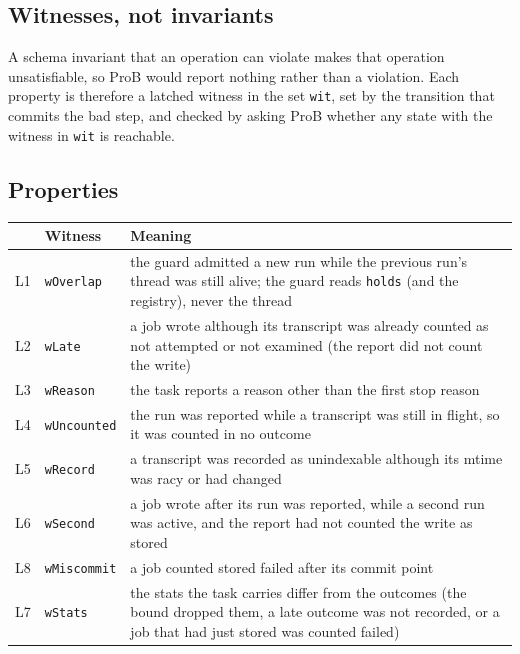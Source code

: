 \documentclass[a4paper,10pt,fleqn]{article}
\newcommand{\field}[1]{\texttt{#1}}
\begin{document}
\subsection{Witnesses, not invariants}

A schema invariant that an operation can violate makes that operation
unsatisfiable, so ProB would report nothing rather than a violation. Each
property is therefore a latched witness in the set \field{wit}, set by the
transition that commits the bad step, and checked by asking ProB whether any
state with the witness in \field{wit} is reachable.

\subsection{Properties}

\begin{center}
\begin{tabular}{@{}cll@{}}
\toprule
 & Witness & Meaning \\
\midrule
L1 & \field{wOverlap} & the guard admitted a new run while the previous run's
  thread was still alive; the guard reads \field{holds} (and the registry),
  never the thread \\
L2 & \field{wLate} & a job wrote although its transcript was already counted
  as not attempted or not examined (the report did not count the write) \\
L3 & \field{wReason} & the task reports a reason other than the first stop
  reason \\
L4 & \field{wUncounted} & the run was reported while a transcript was still
  in flight, so it was counted in no outcome \\
L5 & \field{wRecord} & a transcript was recorded as unindexable although its
  mtime was racy or had changed \\
L6 & \field{wSecond} & a job wrote after its run was reported, while a second run
  was active, and the report had not counted the write as stored \\
L8 & \field{wMiscommit} & a job counted stored failed after its commit point \\
L7 & \field{wStats} & the stats the task carries differ from the outcomes (the
  bound dropped them, a late outcome was not recorded, or a job that had just
  stored was counted failed) \\
\bottomrule
\end{tabular}
\end{center}
\end{document}
